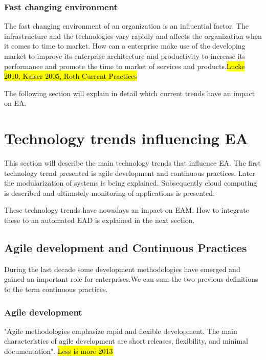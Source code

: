 \subsubsection{Fast changing environment}
The fast changing environment of an organization is an influential factor. The infrastructure and the technologies vary rapidly and affects the organization when it comes to time to market. How can a enterprise make use of the developing market to improve its enterprise architecture and productivity to increase its performance and promote the time to market of services and products.\hl{Lucke 2010, Kaiser 2005, Roth Current Practices}


The following section will explain in detail which current trends have an impact on EA.


\section{Technology trends influencing EA}

This section will describe the main technology trends that influence EA. The first technology trend presented is agile development and continuous practices. Later the modularization of systems is being explained. Subsequently cloud computing is described and ultimately monitoring of applications is presented.

These technology trends have nowadays an impact on EAM. How to integrate these to an automated EAD is explained in the next section. 

\subsection{Agile development and Continuous Practices}

During the last decade some development methodologies have emerged and gained an important role for enterprises.We can sum the two previous definitions to the term continuous practices.

\subsubsection{Agile development}
"Agile methodologies emphasize rapid and flexible development. The main characteristics of agile development are short releases, flexibility, and minimal documentation". \hl{Less is more 2013}

